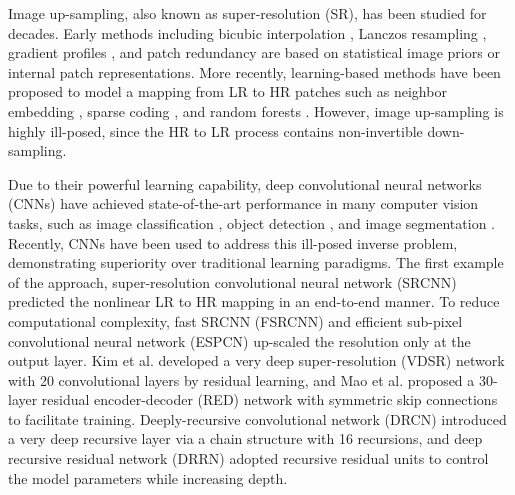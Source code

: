 \documentclass[runningheads]{llncs}
\begin{document}
Image up-sampling, also known as super-resolution (SR), has been studied for decades. Early methods including bicubic interpolation \cite{bicubic}, Lanczos resampling \cite{lanczos}, gradient profiles \cite{gradient}, and patch redundancy \cite{patch} are based on statistical image priors or internal patch representations. More recently, learning-based methods have been proposed to model a mapping from LR to HR patches such as neighbor embedding \cite{ne}, sparse coding \cite{sc}, and random forests \cite{rf}. However, image up-sampling is highly ill-posed, since the HR to LR process contains non-invertible down-sampling.

Due to their powerful learning capability, deep convolutional neural networks (CNNs) have achieved state-of-the-art performance in many computer vision tasks, such as image classification \cite{imagenet}, object detection \cite{detection}, and image segmentation \cite{deeplab}. Recently, CNNs have been used to address this ill-posed inverse problem, demonstrating superiority over traditional learning paradigms. The first example of the approach, super-resolution convolutional neural network (SRCNN) \cite{srcnn} predicted the nonlinear LR to HR mapping in an end-to-end manner. To reduce computational complexity, fast SRCNN (FSRCNN) \cite{fsrcnn} and efficient sub-pixel convolutional neural network (ESPCN) \cite{espcn} up-scaled the resolution only at the output layer. Kim et al. \cite{vdsr} developed a very deep super-resolution (VDSR) network with 20 convolutional layers by residual learning, and Mao et al. \cite{red} proposed a 30-layer residual encoder-decoder (RED) network with symmetric skip connections to facilitate training. Deeply-recursive convolutional network (DRCN) \cite{drcn} introduced a very deep recursive layer via a chain structure with 16 recursions, and deep recursive residual network (DRRN) \cite{drrn} adopted recursive residual units to control the model parameters while increasing depth.
\end{document}
